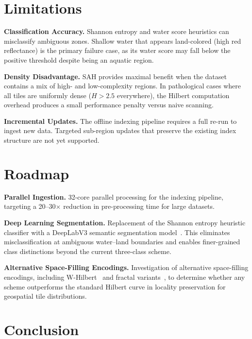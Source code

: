 \documentclass[conference]{IEEEtran}
\begin{document}
\section{Limitations}

\textbf{Classification Accuracy.} Shannon entropy and water score heuristics
can misclassify ambiguous zones. Shallow water that appears land-colored (high red reflectance) is the primary failure case, as its water score may fall below the positive threshold despite being an aquatic region.

\textbf{Density Disadvantage.} SAH provides maximal benefit when the dataset
contains a mix of high- and low-complexity regions. In pathological cases where all tiles are uniformly dense ($H > 2.5$ everywhere), the Hilbert computation overhead produces a small performance penalty versus naive scanning.

\textbf{Incremental Updates.} The offline indexing pipeline requires a full
re-run to ingest new data. Targeted sub-region updates that preserve the existing index structure are not yet supported.

\section{Roadmap}

\textbf{Parallel Ingestion.} 32-core parallel processing for the indexing
pipeline, targeting a 20--30$\times$ reduction in pre-processing time for large datasets.

\textbf{Deep Learning Segmentation.} Replacement of the Shannon entropy
heuristic classifier with a DeepLabV3 semantic segmentation model~\cite{li2021quadtree}. This eliminates misclassification at ambiguous water--land boundaries and enables finer-grained class distinctions beyond the current three-class scheme.

\textbf{Alternative Space-Filling Encodings.} Investigation of alternative
space-filling encodings, including W-Hilbert~\cite{zhang2022whilbert} and fractal variants~\cite{rosso2020texture}, to determine whether any scheme outperforms the standard Hilbert curve in locality preservation for geospatial tile distributions.

\section{Conclusion}
\end{document}
